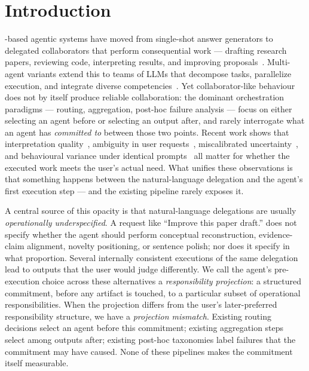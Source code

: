 \section{Introduction}
\label{sec:introduction}

-based agentic systems have moved from single-shot answer generators to delegated collaborators that perform consequential work --- drafting research papers, reviewing code, interpreting results, and improving proposals~\cite{taskaware2026, mast2025}. Multi-agent variants extend this to teams of LLMs that decompose tasks, parallelize execution, and integrate diverse competencies~\cite{whenagree2024}. Yet collaborator-like behaviour does not by itself produce reliable collaboration: the dominant orchestration paradigms --- routing, aggregation, post-hoc failure analysis --- focus on either selecting an agent before or selecting an output after, and rarely interrogate what an agent has \emph{committed to} between those two points. Recent work shows that interpretation quality~\cite{consistency2024}, ambiguity in user requests~\cite{clamber2024, lhaw2024}, miscalibrated uncertainty~\cite{metacog2024, confidencedichotomy2024}, and behavioural variance under identical prompts~\cite{sameprompt2024} all matter for whether the executed work meets the user's actual need. What unifies these observations is that something happens between the natural-language delegation and the agent's first execution step --- and the existing pipeline rarely exposes it.

A central source of this opacity is that natural-language delegations are usually \emph{operationally underspecified}. A request like ``Improve this paper draft.'' does not specify whether the agent should perform conceptual reconstruction, evidence-claim alignment, novelty positioning, or sentence polish; nor does it specify in what proportion. Several internally consistent executions of the same delegation lead to outputs that the user would judge differently. We call the agent's pre-execution choice across these alternatives a \emph{responsibility projection}: a structured commitment, before any artifact is touched, to a particular subset of operational responsibilities. When the projection differs from the user's later-preferred responsibility structure, we have a \emph{projection mismatch}. Existing routing decisions select an agent before this commitment; existing aggregation steps select among outputs after; existing post-hoc taxonomies label failures that the commitment may have caused. None of these pipelines makes the commitment itself measurable.

